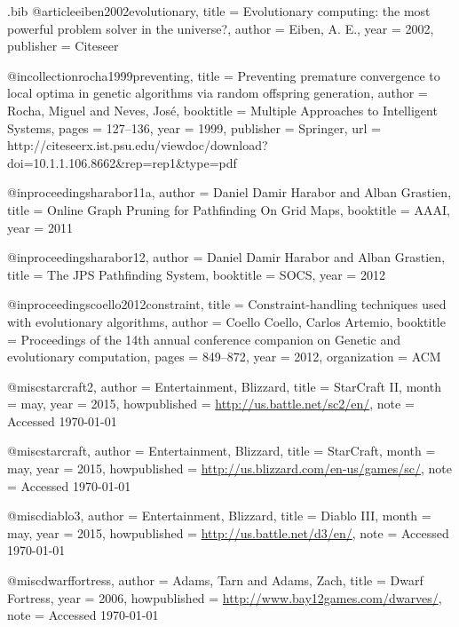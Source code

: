 \begin{filecontents*}{\jobname.bib}
@article{eiben2002evolutionary,
	title		= {{E}volutionary {c}omputing: {t}he {m}ost {p}owerful {p}roblem {s}olver in the {u}niverse?},
	author	= {Eiben, A. E.},
	year		= {2002},
	publisher	= {Citeseer}
}

@incollection{rocha1999preventing,
	title		= {{P}reventing {p}remature {c}onvergence to {l}ocal {o}ptima in {g}enetic {a}lgorithms via {r}andom {o}ffspring {g}eneration},
	author	= {Rocha, Miguel and Neves, Jos{\'e}},
	booktitle	= {Multiple Approaches to Intelligent Systems},
	pages		= {127--136},
	year		= {1999},
	publisher	= {Springer},
	url 		= {http://citeseerx.ist.psu.edu/viewdoc/download?doi=10.1.1.106.8662&rep=rep1&type=pdf}
}

@inproceedings{harabor11a,
	author	= {Daniel Damir Harabor and Alban Grastien},
	title     	= {{O}nline {G}raph {P}runing for {P}athfinding {O}n {G}rid {M}aps},
	booktitle 	= {AAAI},
	year      	= {2011}
}

@inproceedings{harabor12,
	author    	= {Daniel Damir Harabor and Alban Grastien},
	title     	= {{T}he {J}{P}{S} {P}athfinding {S}ystem},
	booktitle 	= {SOCS},
	year      	= {2012}
}

@inproceedings{coello2012constraint,
	title		= {{C}onstraint-{h}andling {t}echniques used with {e}volutionary {a}lgorithms},
	author	= {Coello Coello, Carlos Artemio},
	booktitle	= {Proceedings of the 14th annual conference companion on Genetic and evolutionary computation},
	pages		= {849--872},
	year		= {2012},
	organization	= {ACM}
}

@misc{starcraft2,
	author 	= {Entertainment, Blizzard},
	title 		= {StarCraft II},
	month 	= may,
	year 		= {2015},
	howpublished = {\url{http://us.battle.net/sc2/en/}},
	note  		= {Accessed \today}
}

@misc{starcraft,
	author 	= {Entertainment, Blizzard},
	title 		= {StarCraft},
	month 	= may,
	year 		= {2015},
	howpublished = {\url{http://us.blizzard.com/en-us/games/sc/}},
	note  		= {Accessed \today}
}

@misc{diablo3,
	author 	= {Entertainment, Blizzard},
	title 		= {Diablo III},
	month 	= may,
	year 		= {2015},
	howpublished = {\url{http://us.battle.net/d3/en/}},
	note  		= {Accessed \today}
}

@misc{dwarffortress,
	author 	= {Adams, Tarn and Adams, Zach},
	title 		= {{D}warf {F}ortress},
	year 		= {2006}, 
	howpublished = {\url{http://www.bay12games.com/dwarves/}},
	note		= {Accessed \today}
}

\end{filecontents*}


